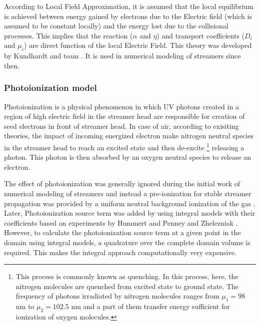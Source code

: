 \documentclass[paper=a4, fontsize=13pt]{scrartcl}
\begin{document}
According to Local Field Approximation, it is assumed that the local equilibrium is achieved between energy gained by electrons due to the Electric field (which is assumed to be constant locally) and the energy lost due to the collisional processes. This implies that the reaction ($\alpha$ and $\eta$) and transport coefficients ($D_i$ and $\mu_i$) are direct function of the local Electric Field. This theory was developed by Kundhardt and team \cite{Kunhardt1988DevelopmentStreamers}. It is used in numerical modeling of streamers since then. 


\subsubsection{Photoionization model}

Photoionization is a physical phenomenon in which UV photons created in a region of high electric field in the streamer head are responsible for creation of seed electrons in front of streamer head. In case of air, according to exisiting theories, the impact of incoming energized electron make nitrogen neutral species in the streamer head to reach an excited state and then de-excite \footnote{This process is commonly known as quenching. In this process, here, the nitrogen molecules are quenched from excited state to ground state. The frequency of photons irradiated by nitrogen molecules ranges from $\mu_1 = 98$ nm to $\mu_2 = 102.5$ nm and a part of them transfer energy sufficient for ionization of oxygen molecules.} releasing a photon. This photon is then absorbed by an oxygen neutral species to release an electron.

The effect of photoionization was generally ignored during the initial work of numerical modeling of streamers and instead a pre-ionization for stable streamer propagation was provided by a uniform neutral background ionization of the gas \cite{Dhali1987TwodimensionalGases}. Later, Photoionization source term was added by using integral models with their coefficients based on experiments by Hummert and Penney \cite{Penney1970PhotoionizationNitrogen} and Zhelezniak \cite{ZhelezniakM.B.andMnatsakanianA.K.andSizykh1982PhotoionizationDischarge}. However, to calculate the photoionization source term at a given point in the domain using integral models, a quadrature over the complete domain volume is required. This makes the integral approach computationally very expensive. 
\end{document}
